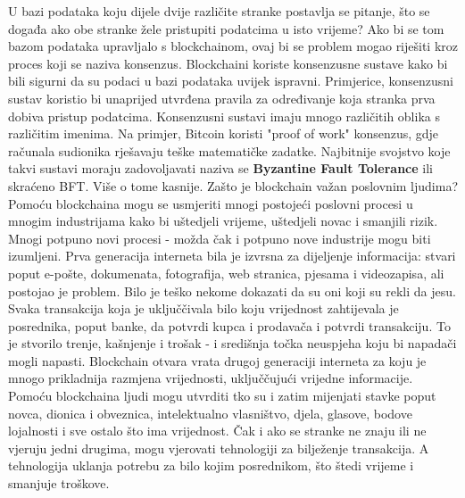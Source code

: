 \documentclass[times, utf8, diplomski]{fer}
\begin{document}
U bazi podataka koju dijele dvije različite stranke postavlja se pitanje, što se događa ako obe stranke žele pristupiti podatcima u isto vrijeme? Ako bi se tom bazom podataka upravljalo s blockchainom, ovaj bi se problem mogao riješiti kroz proces koji se naziva konsenzus. Blockchaini koriste konsenzusne sustave kako bi bili sigurni da su podaci u bazi podataka uvijek ispravni. Primjerice, konsenzusni sustav koristio bi unaprijed utvrđena pravila za određivanje koja stranka prva dobiva pristup podatcima. Konsenzusni sustavi imaju mnogo različitih oblika s različitim imenima. Na primjer, Bitcoin koristi "proof of work" konsenzus, gdje računala sudionika rješavaju teške matematičke zadatke. Najbitnije svojstvo koje takvi sustavi moraju zadovoljavati naziva se \textbf{Byzantine Fault Tolerance} ili skraćeno BFT. Više o tome kasnije. Zašto je blockchain važan poslovnim ljudima? Pomoću blockchaina mogu se usmjeriti mnogi postojeći poslovni procesi u mnogim industrijama kako bi uštedjeli vrijeme, uštedjeli novac i smanjili rizik. Mnogi potpuno novi procesi - možda čak i potpuno nove industrije mogu biti izumljeni. Prva generacija interneta bila je izvrsna za dijeljenje informacija: stvari poput e-pošte, dokumenata, fotografija, web stranica, pjesama i videozapisa, ali postojao je problem. Bilo je teško nekome dokazati da su oni koji su rekli da jesu. Svaka transakcija koja je uključčivala bilo koju vrijednost zahtijevala je posrednika, poput banke, da potvrdi kupca i prodavača i potvrdi transakciju. To je stvorilo trenje, kašnjenje i trošak - i središnja točka neuspjeha koju bi napadači mogli napasti. Blockchain otvara vrata drugoj generaciji interneta za koju je mnogo prikladnija razmjena vrijednosti, uključčujući vrijedne informacije. Pomoću blockchaina ljudi mogu utvrditi tko su i zatim mijenjati stavke poput novca, dionica i obveznica, intelektualno vlasništvo, djela, glasove, bodove lojalnosti i sve ostalo što ima vrijednost. Čak i ako se stranke ne znaju ili ne vjeruju jedni drugima, mogu vjerovati tehnologiji za bilježenje transakcija. A tehnologija uklanja potrebu za bilo kojim posrednikom, što štedi vrijeme i smanjuje troškove.
\end{document}

